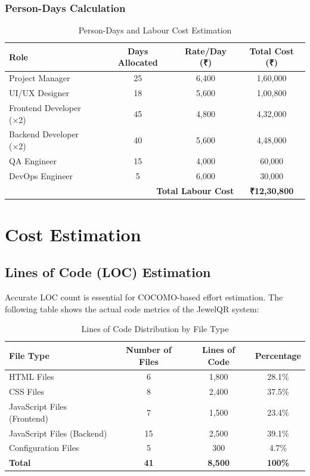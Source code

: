 \documentclass[12pt,a4paper]{article}
\begin{document}
\subsubsection{Person-Days Calculation}

\begin{table}[H]
\centering
\begin{tabular}{|l|c|c|c|}
\hline
\textbf{Role} & \textbf{Days Allocated} & \textbf{Rate/Day (₹)} & \textbf{Total Cost (₹)} \\
\hline
Project Manager & 25 & 6,400 & 1,60,000 \\
\hline
UI/UX Designer & 18 & 5,600 & 1,00,800 \\
\hline
Frontend Developer (×2) & 45 & 4,800 & 4,32,000 \\
\hline
Backend Developer (×2) & 40 & 5,600 & 4,48,000 \\
\hline
QA Engineer & 15 & 4,000 & 60,000 \\
\hline
DevOps Engineer & 5 & 6,000 & 30,000 \\
\hline
\multicolumn{3}{|r|}{\textbf{Total Labour Cost}} & \textbf{₹12,30,800} \\
\hline
\end{tabular}
\caption{Person-Days and Labour Cost Estimation}
\end{table}

\section{Cost Estimation}

\subsection{Lines of Code (LOC) Estimation}

Accurate LOC count is essential for COCOMO-based effort estimation. The following table shows the actual code metrics of the JewelQR system:

\begin{table}[H]
\centering
\begin{tabular}{|l|c|c|c|}
\hline
\textbf{File Type} & \textbf{Number of Files} & \textbf{Lines of Code} & \textbf{Percentage} \\
\hline
HTML Files & 6 & 1,800 & 28.1\% \\
\hline
CSS Files & 8 & 2,400 & 37.5\% \\
\hline
JavaScript Files (Frontend) & 7 & 1,500 & 23.4\% \\
\hline
JavaScript Files (Backend) & 15 & 2,500 & 39.1\% \\
\hline
Configuration Files & 5 & 300 & 4.7\% \\
\hline
\textbf{Total} & \textbf{41} & \textbf{8,500} & \textbf{100\%} \\
\hline
\end{tabular}
\caption{Lines of Code Distribution by File Type}
\end{table}
\end{document}
